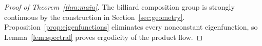\begin{proof}[Proof of Theorem~\ref{thm:main}]
The billiard composition group is strongly continuous by the construction
in Section~\ref{sec:geometry}. Proposition~\ref{prop:eigenfunctions}
eliminates every nonconstant eigenfunction, so Lemma~\ref{lem:spectral}
proves ergodicity of the product flow.
\end{proof}
